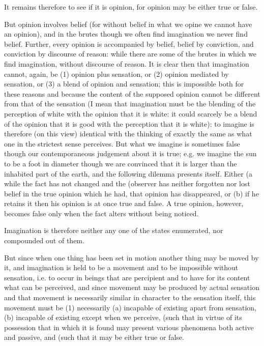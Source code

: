It remains therefore to see if it is opinion, for opinion may be either
true or false. 

But opinion involves belief (for without belief in what we opine we
cannot have an opinion), and in the brutes though we often find imagination
we never find belief. Further, every opinion is accompanied by belief,
belief by conviction, and conviction by discourse of reason: while
there are some of the brutes in which we find imagination, without
discourse of reason. It is clear then that imagination cannot, again,
be (1) opinion plus sensation, or (2) opinion mediated by sensation,
or (3) a blend of opinion and sensation; this is impossible both for
these reasons and because the content of the supposed opinion cannot
be different from that of the sensation (I mean that imagination must
be the blending of the perception of white with the opinion that it
is white: it could scarcely be a blend of the opinion that it is good
with the perception that it is white): to imagine is therefore (on
this view) identical with the thinking of exactly the same as what
one in the strictest sense perceives. But what we imagine is sometimes
false though our contemporaneous judgement about it is true; e.g.
we imagine the sun to be a foot in diameter though we are convinced
that it is larger than the inhabited part of the earth, and the following
dilemma presents itself. Either (a while the fact has not changed
and the (observer has neither forgotten nor lost belief in the true
opinion which he had, that opinion has disappeared, or (b) if he retains
it then his opinion is at once true and false. A true opinion, however,
becomes false only when the fact alters without being noticed.

Imagination is therefore neither any one of the states enumerated,
nor compounded out of them. 

But since when one thing has been set in motion another thing may
be moved by it, and imagination is held to be a movement and to be
impossible without sensation, i.e. to occur in beings that are percipient
and to have for its content what can be perceived, and since movement
may be produced by actual sensation and that movement is necessarily
similar in character to the sensation itself, this movement must be
(1) necessarily (a) incapable of existing apart from sensation, (b)
incapable of existing except when we perceive, (such that in virtue
of its possession that in which it is found may present various phenomena
both active and passive, and (such that it may be either true or false.

